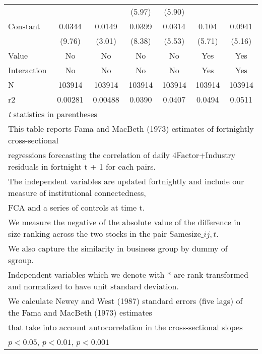 {\begin{tabular}{l*{6}{c}}
                    &                     &                     &      (5.97)         &      (5.90)         &                     &                     \\
[1em]
Constant            &      0.0344\sym{***}&      0.0149\sym{**} &      0.0399\sym{***}&      0.0314\sym{***}&       0.104\sym{***}&      0.0941\sym{***}\\
                    &      (9.76)         &      (3.01)         &      (8.38)         &      (5.53)         &      (5.71)         &      (5.16)         \\
\hline
Value               &          No         &          No         &          No         &          No         &         Yes         &         Yes         \\
Interaction         &          No         &          No         &          No         &          No         &         Yes         &         Yes         \\
N                   &      103914         &      103914         &      103914         &      103914         &      103914         &      103914         \\
r2                  &     0.00281         &     0.00488         &      0.0390         &      0.0407         &      0.0494         &      0.0511         \\
\hline\hline
\multicolumn{7}{l}{\footnotesize \textit{t} statistics in parentheses}\\
\multicolumn{7}{l}{\footnotesize This table reports Fama and MacBeth (1973) estimates of fortnightly cross-sectional}\\
\multicolumn{7}{l}{\footnotesize  regressions forecasting the correlation of daily 4Factor+Industry residuals in fortnight t + 1 for each pairs.}\\
\multicolumn{7}{l}{\footnotesize The independent variables are updated fortnightly and include our measure of institutional connectedness,}\\
\multicolumn{7}{l}{\footnotesize  FCA and a series of controls at time t.}\\
\multicolumn{7}{l}{\footnotesize We measure the negative of the absolute value of the difference in size ranking across the two stocks in the pair $ \text{Samesize}\_{ij,t} $.}\\
\multicolumn{7}{l}{\footnotesize We also capture the similarity in business group by dummy of sgroup.}\\
\multicolumn{7}{l}{\footnotesize Independent variables which  we denote with * are rank-transformed and normalized to have unit standard deviation.}\\
\multicolumn{7}{l}{\footnotesize  We calculate Newey and West (1987) standard errors (five lags) of the Fama and MacBeth (1973) estimates }\\
\multicolumn{7}{l}{\footnotesize  that take into account autocorrelation in the cross-sectional slopes}\\
\multicolumn{7}{l}{\footnotesize \sym{*} \(p<0.05\), \sym{**} \(p<0.01\), \sym{***} \(p<0.001\)}\\
\end{tabular}
}
